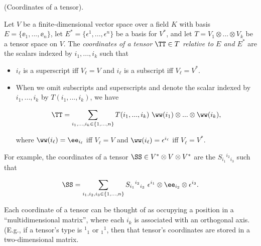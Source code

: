 \begin{defn}
\label{ch::motivated_intro::defn::pq_tensor_coords}
    (Coordinates of a tensor).

    Let $V$ be a finite-dimensional vector space over a field $K$ with basis $E = \{\ee_1, ..., \ee_n\}$, let $E^* = \{\epsilon^1, ..., \epsilon^n\}$ be a basis for $V^*$, and let $T = V_1 \otimes ... \otimes V_k$ be a tensor space on $V$. The \textit{coordinates of a tensor $\TT \in T$ relative to $E$ and $E^*$} are the scalars indexed by $i_1, ..., i_k$ such that
    
    \begin{itemize}
        \item $i_\ell$ is a superscript iff $V_\ell = V$ and $i_\ell$ is a subscript iff $V_\ell = V^*$.
        \item When we omit subscripts and superscripts and denote the scalar indexed by $i_1, ..., i_k$ by $T(i_1, ..., i_k)$, we have 
        
        \begin{align*}
            \TT = \sum_{i_1, ..., i_k \in \{1, ..., n\}} T(i_1, ..., i_k) \spc \ww(i_1) \otimes ... \otimes \ww(i_k),
        \end{align*}
        
        where $\ww(i_\ell) = \ee_{i_\ell}$ iff $V_\ell = V$ and $\ww(i_\ell) = \epsilon^{i_\ell}$ iff $V_\ell = V^*$.
    \end{itemize}
    
    For example, the coordinates of a tensor $\SS \in V^* \otimes V \otimes V^*$ are the $S_{i_1}{}^{i_2}{}_{i_3}$ such that
    
    \begin{align*}
        \SS = \sum_{i_1, i_2, i_3 \in \{1, ..., n\}} S_{i_1}{}^{i_2}{}_{i_3} \spc \epsilon^{i_1} \otimes \ee_{i_2} \otimes \epsilon^{i_3}.
    \end{align*}
    
    
    Each coordinate of a tensor can be thought of as occupying a position in a           ``multidimensional matrix'', where each $i_k$ is associated with an orthogonal axis. (E.g., if a tensor's type is $^1{}_1$ or $_1{}^1$, then that tensor's coordinates are stored in a two-dimensional matrix.
\end{defn}

